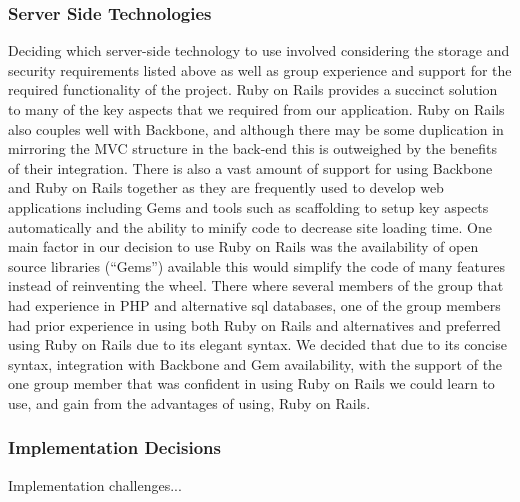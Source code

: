 	\subsubsection{Server Side Technologies}
		Deciding which server-side technology to use involved considering the storage and security requirements listed above as well as group experience and support for the required functionality of the project. Ruby on Rails provides a succinct solution to many of the key aspects that we required from our application. Ruby on Rails also couples well with Backbone, and although there may be some duplication in mirroring the MVC structure in the back-end this is outweighed by the benefits of their integration. There is also a vast amount of support for using Backbone and Ruby on Rails together as they are frequently used to develop web applications including Gems and tools such as scaffolding to setup key aspects automatically and the ability to minify code to decrease site loading time.
		One main factor in our decision to use Ruby on Rails was the availability of open source libraries (“Gems”) available this would simplify the code of many features instead of reinventing the wheel.
		There where several members of the group that had experience in PHP and alternative sql databases, one of the group members had prior experience in using both Ruby on Rails and alternatives and preferred using Ruby on Rails due to its elegant syntax. We decided that due to its concise syntax, integration with Backbone and Gem availability, with the support of the one group member that was confident in using Ruby on Rails we could learn to use, and gain from the advantages of using, Ruby on Rails.
	
	\subsubsection{Implementation Decisions}
		Implementation challenges...